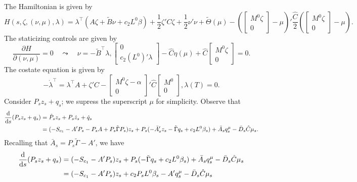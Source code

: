 \documentclass{article}
\newcommand\diff[2]{\frac{{\rm d}{#1}}{{\rm d}{#2}}}
\newcommand\pdiff[2]{\frac{\partial{#1}}{\partial{#2}}}
\newcommand\demi{\frac{1}{2}}
\begin{document}
The Hamiltonian is given by
\[
H(s, \zeta, (\nu, \mu), \lambda) = \lambda^\top (A \zeta + \tilde{B} \nu + c_2 L^0 \beta) + \demi \zeta' C \zeta + \demi \nu' \nu + \tilde{\Theta}(\mu) - \left(\begin{bmatrix}M^0 \zeta \\ 0\end{bmatrix} - \mu\right)' \frac{\hat{C}}{2} \left(\begin{bmatrix}M^0 \zeta \\ 0\end{bmatrix} - \mu\right).
\]
The staticizing controls are given by
\begin{equation}\label{eq:control}
\pdiff{H}{(\nu, \mu)} = 0 \quad \leadsto \quad \nu = -\tilde{B}^\top \lambda, \begin{bmatrix}0 \\ c_2 (L^0)' \lambda\end{bmatrix} - \hat{C} \eta(\mu) + \hat{C} \begin{bmatrix}M^0 \zeta \\ 0\end{bmatrix} = 0.
\end{equation}
The costate equation is given by
\begin{equation}\label{eq:costate}
-\dot{\lambda}^\top = \lambda^\top A + \zeta' C - \begin{bmatrix}M^0 \zeta - \alpha \\ 0\end{bmatrix}' \hat{C} \begin{bmatrix}M^0\\0\end{bmatrix}, \lambda(T) = 0.
\end{equation}
Consider $P_s z_s + q_s$; we supress the superscript $\mu$ for simplicity. Observe that
\begin{align*}
\diff{}{s} (P_s z_s + q_s) &= \dot{P}_s z_s + P_s \dot{z}_s + \dot{q}_s\\
&= (-S_{c_1} - A' P_s - P_s A + P_s \tilde{\Gamma} P_s) z_s + P_s (-\bar{A}_s' z_s - \tilde{\Gamma} q_s + c_2 L^0 \beta_s) + \bar{A}_s q^\mu_s - \bar{D}_s \hat{C} \mu_s.
\end{align*}
Recalling that $\bar{A}_s = P_s \tilde{\Gamma} - A'$, we have
\begin{align*}
\diff{}{s} (P_s z_s + q_s) &= (-S_{c_1} - A' P_s) z_s + P_s (- \tilde{\Gamma} q_s + c_2 L^0 \beta_s) + \bar{A}_s q^\mu_s - \bar{D}_s \hat{C} \mu_s\\
&= (-S_{c_1} - A' P_s) z_s + c_2 P_s L^0 \beta_s - A' q^\mu_s - \bar{D}_s \hat{C} \mu_s
\end{align*}
\end{document}
